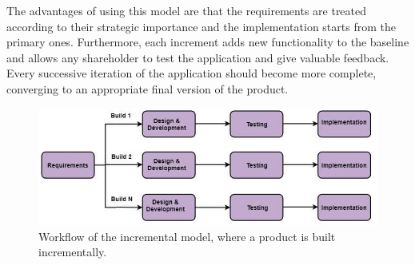 The advantages of using this model are that the requirements are treated according to their strategic importance and the implementation starts from the primary ones. Furthermore, each increment adds new functionality to the baseline and allows any shareholder to test the application and give valuable feedback. Every successive iteration of the application should become more complete, converging to an appropriate final version of the product.

\begin{figure}[H]
	\centering
	\includegraphics[scale=0.95]{img/incremental.jpg}
	\caption{Workflow of the incremental model, where a product is built incrementally.}
	\label{Introduction:Incremental Model}
\end{figure} 

\newpage
